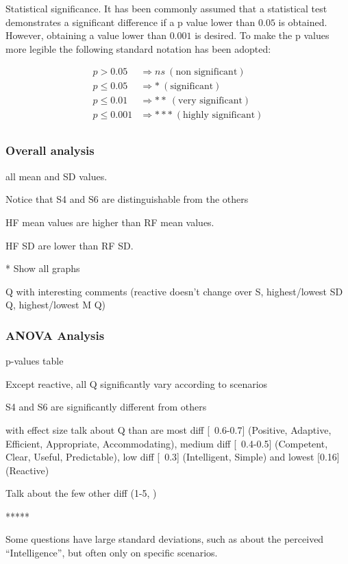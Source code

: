 Statistical significance. It has been commonly assumed that a statistical test demonstrates a significant difference if a p value lower than $0.05$ is obtained. However, obtaining a value lower than $0.001$ is desired. To make the p values more legible the following standard notation has been adopted:

\begin{align*}
    p > 0.05        & \Rightarrow ns ~ (\textrm{non significant})\\
    p \leq 0.05     & \Rightarrow * ~ (\textrm{significant})\\
    p \leq 0.01     & \Rightarrow ** ~ (\textrm{very significant})\\
    p \leq 0.001    & \Rightarrow *** ~ (\textrm{highly significant})\\
\end{align*}

\subsubsection{Overall analysis}

all mean and SD values. 

Notice that S4 and S6 are distinguishable from the others

HF mean values are higher than RF mean values.

HF SD are lower than RF SD.

* Show all graphs

Q with interesting comments (reactive doesn't change over S, highest/lowest SD Q, highest/lowest M Q) 

\subsubsection{ANOVA Analysis}

p-values table

Except reactive, all Q significantly vary according to scenarios

S4 and S6 are significantly different from others

with effect size talk about Q than are most diff [~0.6-0.7] (Positive, Adaptive, Efficient, Appropriate, Accommodating), medium diff [~0.4-0.5] (Competent, Clear, Useful, Predictable), low diff [~0.3] (Intelligent, Simple) and lowest [0.16] (Reactive)

Talk about the few other diff (1-5, )

*****

Some questions have large standard deviations, such as about the perceived ``Intelligence'', but often only on specific scenarios.

